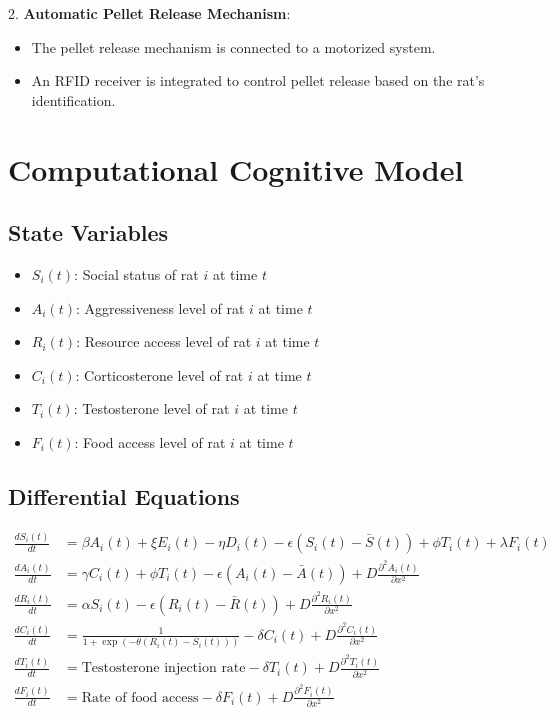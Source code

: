 \documentclass[english, a4paper, 11pt]{article}
\begin{document}
2. \textbf{Automatic Pellet Release Mechanism}:
   \begin{itemize}
       \item The pellet release mechanism is connected to a motorized system.
       \item An RFID receiver is integrated to control pellet release based on the rat's identification.
   \end{itemize}

\section*{Computational Cognitive Model}
\subsection*{State Variables}
\begin{itemize}
	\item \( S_i(t) \): Social status of rat \( i \) at time \( t \)
	\item \( A_i(t) \): Aggressiveness level of rat \( i \) at time \( t \)
	\item \( R_i(t) \): Resource access level of rat \( i \) at time \( t \)
	\item \( C_i(t) \): Corticosterone level of rat \( i \) at time \( t \)
	\item \( T_i(t) \): Testosterone level of rat \( i \) at time \( t \)
	\item \( F_i(t) \): Food access level of rat \( i \) at time \( t \)
\end{itemize}

\subsection*{Differential Equations}
\begin{align*}
	\frac{dS_i(t)}{dt} & = \beta A_i(t) + \xi E_i(t) - \eta D_i(t) - \epsilon (S_i(t) - \bar{S}(t)) + \phi T_i(t) + \lambda F_i(t)  \\
	\frac{dA_i(t)}{dt} & = \gamma C_i(t) + \phi T_i(t) - \epsilon (A_i(t) - \bar{A}(t)) + D \frac{\partial^2 A_i(t)}{\partial x^2}  \\
	\frac{dR_i(t)}{dt} & = \alpha S_i(t) - \epsilon (R_i(t) - \bar{R}(t)) + D \frac{\partial^2 R_i(t)}{\partial x^2}                \\
	\frac{dC_i(t)}{dt} & = \frac{1}{1 + \exp(-\theta (R_i(t) - S_i(t)))} - \delta C_i(t) + D \frac{\partial^2 C_i(t)}{\partial x^2} \\
	\frac{dT_i(t)}{dt} & = \text{Testosterone injection rate} - \delta T_i(t) + D \frac{\partial^2 T_i(t)}{\partial x^2}            \\
	\frac{dF_i(t)}{dt} & = \text{Rate of food access} - \delta F_i(t) + D \frac{\partial^2 F_i(t)}{\partial x^2}
\end{align*}
\end{document}
